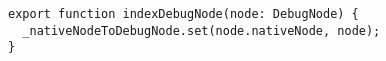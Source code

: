 \begin{verbatim}
export function indexDebugNode(node: DebugNode) {
  _nativeNodeToDebugNode.set(node.nativeNode, node);
}
\end{verbatim}
